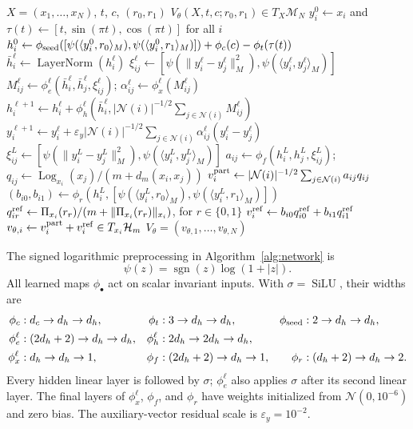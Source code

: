 \documentclass[10pt]{article}
\newcommand{\HH}{\mathcal{H}}
\newcommand{\Log}{\operatorname{Log}}
\newcommand{\Proj}{\Pi}
\newcommand{\dist}{d_m}
\begin{document}
\begin{algorithm}[H]
\caption{JetFUEL vector field $V_\theta(X,t,c;r_0,r_1)$}
\label{alg:network}
\small
\begin{algorithmic}[1]
\Require $X=(x_1,\ldots,x_N)$, $t$, $c$, $(r_0,r_1)$
\Ensure $V_\theta(X,t,c;r_0,r_1)\in T_X\mathcal{M}_N$
\State $y_i^0\gets x_i$ and $\tau(t)\gets[t,\sin(\pi t),\cos(\pi t)]$ for all $i$
\State $h_i^0\gets\phi_{\rm seed}([\psi(\langle y_i^0,r_0\rangle_M),\psi(\langle y_i^0,r_1\rangle_M)])+\phi_c(c)-\phi_t(\tau(t))$
  \State $\bar h_i^\ell\gets\operatorname{LayerNorm}(h_i^\ell)$
    \State $\xi_{ij}^\ell\gets[\psi(\|y_i^\ell-y_j^\ell\|_M^2),\psi(\langle y_i^\ell,y_j^\ell\rangle_M)]$
    \State $M_{ij}^\ell\gets\phi_e^\ell(\bar h_i^\ell,\bar h_j^\ell,\xi_{ij}^\ell)$; \quad $\alpha_{ij}^\ell\gets\phi_x^\ell(M_{ij}^\ell)$
  \EndFor
  \State $h_i^{\ell+1}\gets h_i^\ell+\phi_h^\ell\!\left(\bar h_i^\ell,|\mathcal{N}(i)|^{-1/2}\sum_{j\in\mathcal{N}(i)}M_{ij}^\ell\right)$
  \State $y_i^{\ell+1}\gets y_i^\ell+\varepsilon_y|\mathcal{N}(i)|^{-1/2}\sum_{j\in\mathcal{N}(i)}\alpha_{ij}^\ell(y_i^\ell-y_j^\ell)$
\EndFor
{}
  \State $\xi_{ij}^L\gets[\psi(\|y_i^L-y_j^L\|_M^2),\psi(\langle y_i^L,y_j^L\rangle_M)]$
  \State $a_{ij}\gets\phi_f(h_i^L,h_j^L,\xi_{ij}^L)$; \quad $q_{ij}\gets\Log_{x_i}(x_j)/(m+\dist(x_i,x_j))$
\EndFor
\State $v_i^{\rm part}\gets|\mathcal{N}(i)|^{-1/2}\sum_{j\in\mathcal{N}(i)}a_{ij}q_{ij}$
\State $(b_{i0},b_{i1})\gets\phi_r(h_i^L,[\psi(\langle y_i^L,r_0\rangle_M),\psi(\langle y_i^L,r_1\rangle_M)])$
\State $q_{ir}^{\rm ref}\gets\Proj_{x_i}(r_r)/(m+\|\Proj_{x_i}(r_r)\|_{x_i})$, for $r\in\{0,1\}$
\State $v_i^{\rm ref}\gets b_{i0}q_{i0}^{\rm ref}+b_{i1}q_{i1}^{\rm ref}$
\State $v_{\theta,i}\gets v_i^{\rm part}+v_i^{\rm ref}\in T_{x_i}\HH_m$
\State \Return $V_\theta=(v_{\theta,1},\ldots,v_{\theta,N})$
\end{algorithmic}
\end{algorithm}

The signed logarithmic preprocessing in Algorithm~\ref{alg:network} is
\begin{equation}
 \psi(z)=\operatorname{sgn}(z)\log(1+|z|).
 \label{eq:signed-log}
\end{equation}
All learned maps $\phi_\bullet$ act on scalar invariant inputs. With
$\sigma=\operatorname{SiLU}$, their widths are
\begin{align}
 \phi_c &: d_c\to d_h\to d_h,& \phi_t &: 3\to d_h\to d_h,&
 \phi_{\rm seed}&:2\to d_h\to d_h,\\
 \phi_e^\ell &: (2d_h+2)\to d_h\to d_h,&
 \phi_h^\ell &:2d_h\to2d_h\to d_h,\\
 \phi_x^\ell &:d_h\to d_h\to1,&
 \phi_f &: (2d_h+2)\to d_h\to1,&
 \phi_r &: (d_h+2)\to d_h\to2.
 \label{eq:mlp-widths}
\end{align}
Every hidden linear layer is followed by $\sigma$; $\phi_e^\ell$ also applies
$\sigma$ after its second linear layer. The final layers of $\phi_x^\ell$, $\phi_f$,
and $\phi_r$ have weights initialized from $\mathcal{N}(0,10^{-6})$ and zero bias.
The auxiliary-vector residual scale is $\varepsilon_y=10^{-2}$.
\end{document}
